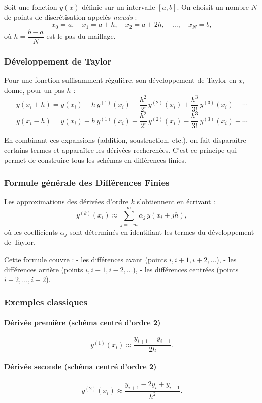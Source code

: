 \documentclass[12pt, a4paper]{article}
\begin{document}
Soit une fonction $y(x)$ définie sur un intervalle $[a,b]$.
On choisit un nombre $N$ de points de discrétisation appelés \textit{nœuds} :
\[
x_0 = a,\quad x_1 = a + h,\quad x_2 = a + 2h,\quad \dots,\quad x_N = b,
\]
où $h = \dfrac{b - a}{N}$ est le pas du maillage.


\subsubsection{Développement de Taylor}

Pour une fonction suffisamment régulière, son développement de Taylor en $x_i$
donne, pour un pas $h$ :
\[
y(x_i + h)
  = y(x_i)
  + h\,y^{(1)}(x_i)
  + \frac{h^2}{2!}\,y^{(2)}(x_i)
  + \frac{h^3}{3!}\,y^{(3)}(x_i)
  + \cdots
\]
\[
y(x_i - h)
  = y(x_i)
  - h\,y^{(1)}(x_i)
  + \frac{h^2}{2!}\,y^{(2)}(x_i)
  - \frac{h^3}{3!}\,y^{(3)}(x_i)
  + \cdots
\]

En combinant ces expansions (addition, soustraction, etc.), on fait disparaître 
certains termes et apparaître les dérivées recherchées.  
C’est ce principe qui permet de construire tous les schémas en différences finies.

\subsubsection{Formule générale des Différences Finies}

Les approximations des dérivées d’ordre $k$ s’obtiennent en écrivant :
\[
y^{(k)}(x_i)
\approx
\sum_{j=-m}^{m} \alpha_j\, y(x_i + jh),
\]
où les coefficients $\alpha_j$ sont déterminés en identifiant les termes du développement de Taylor.

Cette formule couvre :
- les différences avant (points $i, i+1, i+2,\dots$),  
- les différences arrière (points $i, i-1, i-2,\dots$),  
- les différences centrées (points $i-2,\dots,i+2$).

\subsubsection{Exemples classiques}

\paragraph{Dérivée première (schéma centré d’ordre 2)}
\[
y^{(1)}(x_i) \approx \frac{y_{i+1} - y_{i-1}}{2h}.
\]

\paragraph{Dérivée seconde (schéma centré d’ordre 2)}
\[
y^{(2)}(x_i) 
\approx 
\frac{y_{i+1} - 2y_i + y_{i-1}}{h^2}.
\]
\end{document}
